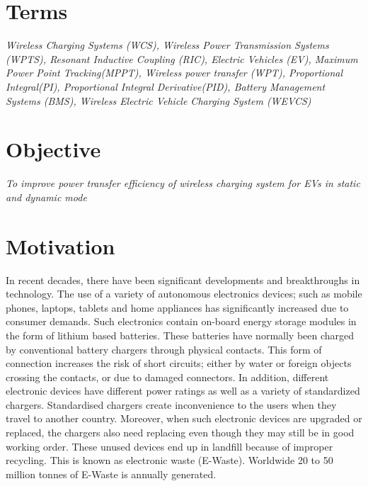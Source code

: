 \documentclass[12pt]{article}
\begin{document}

\tableofcontents
\newpage

\renewcommand{\baselinestretch}{1.5}
\section{Terms}
\textit{Wireless Charging Systems (WCS), 
	Wireless Power Transmission Systems (WPTS), 
	Resonant Inductive Coupling (RIC),
	Electric Vehicles (EV), 
	Maximum Power Point Tracking(MPPT),
	Wireless power transfer (WPT),
	Proportional Integral(PI),
	Proportional Integral Derivative(PID),
	Battery Management Systems (BMS),
Wireless Electric Vehicle Charging System (WEVCS)}


\section{Objective}
\textit{To improve power transfer efficiency of wireless charging system for EVs in static and dynamic mode}

\section{Motivation}
In recent decades, there have been significant developments and breakthroughs in technology. The use of a variety of autonomous electronics devices; such as mobile phones, laptops, tablets and home appliances has significantly increased due to consumer demands. Such electronics contain on-board energy storage modules in the form of lithium based batteries. These batteries have normally been charged by conventional battery chargers through physical contacts. This form of connection increases the risk of short circuits; either by water or foreign objects crossing the contacts, or due to damaged connectors. In addition, different electronic devices have different power ratings as well as a variety of standardized chargers. Standardised chargers create inconvenience to the users when they travel to another country. Moreover, when such electronic devices are upgraded or replaced, the chargers also need replacing even though they may still be in good working order. These unused devices end up in landfill because of improper recycling. This is known as electronic waste (E-Waste). Worldwide 20 to 50 million tonnes of E-Waste is annually generated.
\end{document}

